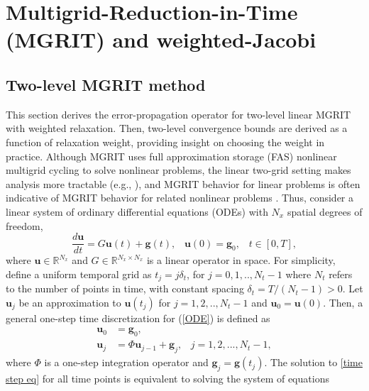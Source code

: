 \documentclass[VANCOUVER,STIX1COL]{WileyNJD-v2}
\begin{document}
\section{Multigrid-Reduction-in-Time (MGRIT) and weighted-Jacobi}
\label{sec:methods}
\subsection{Two-level MGRIT method}

This section derives the error-propagation operator for two-level linear MGRIT with weighted relaxation. Then, two-level convergence bounds are derived as a function of relaxation weight, providing insight on choosing the weight in practice. Although MGRIT uses full approximation storage (FAS) nonlinear multigrid cycling \cite{Brandt_1977} to solve nonlinear problems, the linear two-grid setting makes analysis more tractable (e.g.,  \cite{FriMac2015, Do2016, HeSoNoRoFaSc2018, So2019, FrSo2020}), and MGRIT behavior for linear problems is often indicative of MGRIT behavior for related nonlinear problems \cite{Do2016}. Thus, consider a linear system of ordinary differential equations (ODEs) with $N_x$ spatial degrees of freedom,
\begin{equation}\label{ODE}
\frac{d \mathbf{u}}{dt} = G\mathbf{u}(t) + \mathbf{g}(t), \hspace{10pt} \mathbf{u}(0)=\mathbf{g}_0, \hspace{10pt} t \in [0, T],
\end{equation}
where $\mathbf{u} \in \mathbb{R}^{N_x}$ and $G\in\mathbb{R}^{N_x\times N_x}$ is a linear operator in space. For simplicity, define a uniform temporal grid as $t_j = j \delta_t$, for $j=0,1,..,N_t-1$ where $N_t$ refers to the number of points in time, with constant spacing $\delta_t = T / (N_t - 1) > 0$. Let $\mathbf{u}_{j}$ be an approximation to $\mathbf{u}(t_j)$ for $j=1,2,..,N_t-1$ and $\mathbf{u}_0 = \mathbf{u}(0)$. Then, a general one-step time discretization for (\ref{ODE}) is defined as
\begin{equation}\label{time step eq}
\begin{aligned}
\mathbf{u}_0 &= \mathbf{g}_0,\\
\mathbf{u}_j &= \Phi \mathbf{u}_{j-1} + \mathbf{g}_j, \hspace{10pt} j=1,2,...,N_t-1 ,
\end{aligned}
\end{equation}
{where $\Phi$ is a one-step integration operator and $\mathbf{g}_j = \mathbf{g}(t_j)$.}
The solution to \eqref{time step eq} for all time points is equivalent to solving the system of equations
\end{document}

